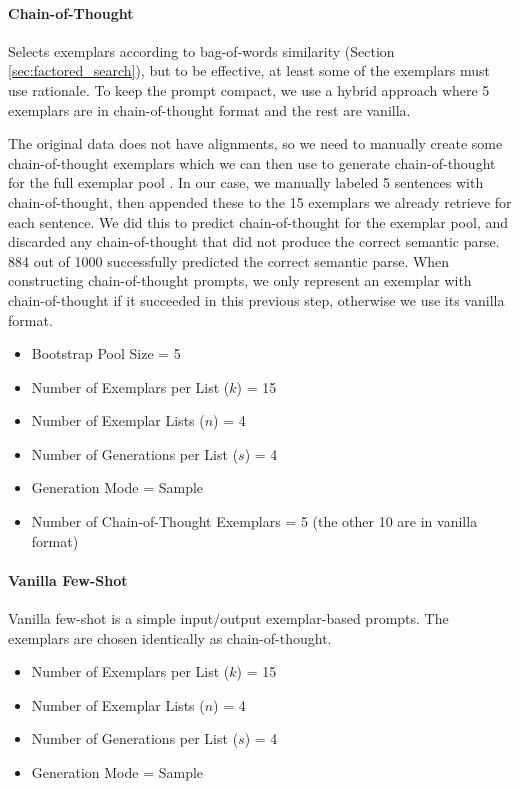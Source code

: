 \documentclass{article} \usepackage{iclr2022_conference,times}
\begin{document}
\paragraph{Chain-of-Thought}

Selects exemplars according to bag-of-words similarity (Section \ref{sec:factored_search}), but to be effective, at least some of the exemplars must use rationale. To keep the prompt compact, we use a hybrid approach where 5 exemplars are in chain-of-thought format and the rest are vanilla.

The original data does not have alignments, so we need to manually create some chain-of-thought exemplars which we can then use to generate chain-of-thought for the full exemplar pool \citep{zelikman2022star}. In our case, we manually labeled 5 sentences with chain-of-thought, then appended these to the 15 exemplars we already retrieve for each sentence. We did this to predict chain-of-thought for the exemplar pool, and discarded any chain-of-thought that did not produce the correct semantic parse. 884 out of 1000 successfully predicted the correct semantic parse. When constructing chain-of-thought prompts, we only represent an exemplar with chain-of-thought if it succeeded in this previous step, otherwise we use its vanilla format.

\begin{itemize}
    \item Bootstrap Pool Size = 5
    \item Number of Exemplars per List ($k$) = 15
    \item Number of Exemplar Lists ($n$) = 4
    \item Number of Generations per List ($s$) = 4
    \item Generation Mode = Sample
    \item Number of Chain-of-Thought Exemplars = 5 (the other 10 are in vanilla format)
\end{itemize}

\paragraph{Vanilla Few-Shot}

Vanilla few-shot is a simple input/output exemplar-based prompts. The exemplars are chosen identically as chain-of-thought.

\begin{itemize}
    \item Number of Exemplars per List ($k$) = 15
    \item Number of Exemplar Lists ($n$) = 4
    \item Number of Generations per List ($s$) = 4
    \item Generation Mode = Sample
\end{itemize}
\end{document}
